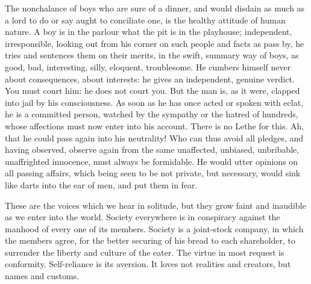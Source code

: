 \documentclass[12pt]{article}
\begin{document}
The nonchalance of boys who are sure of a dinner, and would disdain as much
as a lord to do or say aught to conciliate one, is the healthy attitude of
human nature. A boy is in the parlour what the pit is in the playhouse;
independent, irresponsible, looking out from his corner on such people and
facts as pass by, he tries and sentences them on their merits, in the swift,
summary way of boys, as good, bad, interesting, silly, eloquent,
troublesome. He cumbers himself never about consequences, about interests:
he gives an independent, genuine verdict. You must court him: he does not
court you. But the man is, as it were, clapped into jail by his
consciousness. As soon as he has once acted or spoken with eclat, he is a
committed person, watched by the sympathy or the hatred of hundreds, whose
affections must now enter into his account. There is no Lethe for this. Ah,
that he could pass again into his neutrality! Who can thus avoid all
pledges, and having observed, observe again from the same unaffected,
unbiased, unbribable, unaffrighted innocence, must always be formidable. He
would utter opinions on all passing affairs, which being seen to be not
private, but necessary, would sink like darts into the ear of men, and put
them in fear.

These are the voices which we hear in solitude, but they grow faint and
inaudible as we enter into the world. Society everywhere is in conspiracy
against the manhood of every one of its members. Society is a joint-stock
company, in which the members agree, for the better securing of his bread to
each shareholder, to surrender the liberty and culture of the eater. The
virtue in most request is conformity. Self-reliance is its aversion. It
loves not realities and creators, but names and customs.
\end{document}
